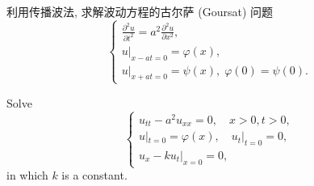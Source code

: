 \begin{exercise}[3]
  利用传播波法, 求解波动方程的古尔萨 (Goursat) 问题
  \[\begin{cases}
    \frac{\partial^2u}{\partial t^2} = a^2 \frac{\partial^2u}{\partial x^2}, \\
    u|_{x-at=0} = \varphi(x), \\
    u|_{x+at=0} = \psi(x),\; \varphi(0) = \psi(0).
  \end{cases}\]
\end{exercise}



\begin{exercise}[5]
  Solve
  \[\begin{cases}
    u_{tt} - a^2 u_{xx} = 0,\quad x>0, t>0, \\
    u|_{t=0} = \varphi(x),\quad u_t|_{t=0} = 0, \\
    u_x - ku_t|_{x=0} = 0,
  \end{cases}\]
  in which $k$ is a constant.
\end{exercise}

